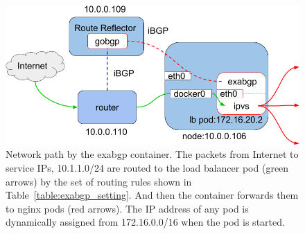 \begin{figure}[tb]
  \centering
  \includegraphics[width=0.8\columnwidth]{Figs/exabgp}
  
  \par\bigskip
  \centering
  \begin{minipage}{0.9\columnwidth}
    \caption[Network path by the exabgp container]{
      Network path by the exabgp container.
      The packets from Internet to service IPs, 10.1.1.0/24 are routed to the load balancer pod (green arrows) by the set of routing rules shown in Table~\ref{table:exabgp_setting}.
      And then the  container forwards them to nginx pods (red arrows).
      The IP address of any pod is dynamically assigned from 172.16.0.0/16 when the pod is started. 
    }
    \label{fig:exabgp_schem}
  \end{minipage}

\end{figure}

